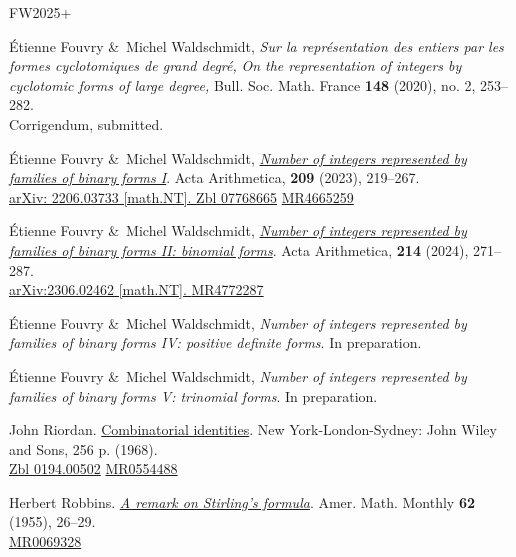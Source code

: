 \documentclass[10pt]{article}
\theoremstyle{definition}
\numberwithin{equation}{section}
\begin{document}
\begin{thebibliography}{FW2025+}
 
 \'Etienne Fouvry \&\ Michel Waldschmidt,
 {\em Sur la repr\' esentation des entiers par les formes cyclotomiques de grand degr\' e,}
{\em On the representation of integers by cyclotomic forms of large degree,}
Bull. Soc. Math. France {\bf 148} (2020), no. 2, 253--282.
\\
Corrigendum, submitted. 
 
 
\'Etienne Fouvry \&\ Michel Waldschmidt,
 \href{https://doi.org/10.4064/aa220606-16-2}{\em Number of integers represented by families of binary forms I}. Acta Arithmetica, {\bf 209} (2023), 219--267. 
\\
\href{http://arxiv.org/abs/2206.03733}{arXiv: 2206.03733 [math.NT]. }
\qquad
 \href{http://msp.org/idx/zbl/07768665}{Zbl 07768665} 
\qquad
 \href{https://mathscinet.ams.org/mathscinet/relay-station?mr=4665259}{MR4665259}
 
 

\'Etienne Fouvry \&\ Michel Waldschmidt, 
\href{https://doi.org/10.4064/aa230525-6-9}
 {\em Number of integers represented by families of binary forms II: binomial forms}. Acta Arithmetica, 
{\bf 214} (2024), 271--287. 
 \\
\href{http://arxiv.org/abs/2306.02462}{arXiv:2306.02462 [math.NT]. }
 \qquad
 \href{https://mathscinet.ams.org/mathscinet/relay-station?mr=4772287}{MR4772287}
 
 
\'Etienne Fouvry \&\ Michel Waldschmidt,
 {\em Number of integers represented by families of binary forms IV: positive definite forms}. In preparation. 
 
\'Etienne Fouvry \&\ Michel Waldschmidt,
 {\em Number of integers represented by families of binary forms V: trinomial forms}. In preparation. 
 
 
John Riordan.
\href{http://books.ms/main/42AA005C1B2487AD51962DAB10DDA9B4}
{Combinatorial identities}. New York-London-Sydney: John Wiley and Sons, 256 p. (1968).
 \\
 \href{http://msp.org/idx/zbl/0194.00502}{Zbl 0194.00502}\qquad
 \href{https://mathscinet.ams.org/mathscinet/relay-station?mr=0554488}{MR0554488} 
 
Herbert Robbins.
\href{https://doi.org/10.2307/2308012}{\em A remark on Stirling's formula}.
Amer. Math. Monthly {\bf 62} (1955), 26--29.
\\
 \href{https://mathscinet.ams.org/mathscinet/relay-station?mr=0069328}{MR0069328}
 

\end{thebibliography}
\end{document}

